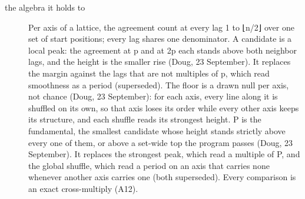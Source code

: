 \begin{description}
\item[{the algebra it holds to}] Per axis of a lattice, the agreement count at every lag 1 to ⌊n/2⌋ over one set of start positions; every lag shares one denominator. A candidate is a local peak: the agreement at p and at 2p each stands above both neighbor lags, and the height is the smaller rise (Doug, 23 September). It replaces the margin against the lags that are not multiples of p, which read smoothness as a period (superseded). The floor is a drawn null per axis, not chance (Doug, 23 September): for each axis, every line along it is shuffled on its own, so that axis loses its order while every other axis keeps its structure, and each shuffle reads its strongest height. P is the fundamental, the smallest candidate whose height stands strictly above every one of them, or above a set-wide top the program passes (Doug, 23 September). It replaces the strongest peak, which read a multiple of P, and the global shuffle, which read a period on an axis that carries none whenever another axis carries one (both superseded). Every comparison is an exact cross-multiply (A12).

\end{description}

